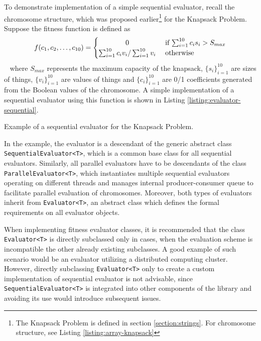 To demonstrate implementation of a simple sequential evaluator, recall the chromosome structure, which was proposed earlier\footnote{The Knapsack Problem is defined in section \ref{section:strings}. For chromosome structure, see Listing \ref{listing:array-knapsack}} for the Knapsack Problem. Suppose the fitness function is defined as
~
\begin{align}
	f(c_1, c_2, \dots, c_{10})
	=
	\begin{cases} 
		\hfill 0 \hfill & \text{ if $\sum_{i=1}^{10} c_i s_i>S_{max}$} \\
		\hfill \sum_{i=1}^{10} c_i v_i / \sum_{i=1}^{10} v_i \hfill & \text{ otherwise} \\
	\end{cases}
\end{align}
~
where $S_{max}$ represents the maximum capacity of the knapsack, $\{s_i\}_{i=1}^{10}$ are sizes of things, $\{v_i\}_{i=1}^{10}$ are values of things and $\{c_i\}_{i=1}^{10}$ are 0/1 coefficients generated from the Boolean values of the chromosome. A simple implementation of a sequential evaluator using this function is shown in Listing \ref{listing:evaluator-sequential}.

\begin{listing}[ht]
	\caption{Example of a sequential evaluator for the Knapsack Problem.}
	\label{listing:evaluator-sequential}
\end{listing}

In the example, the evaluator is a descendant of the generic abstract class \texttt{SequentialEvaluator<T>}, which is a common base class for all sequential evaluators. Similarly, all parallel evaluators have to be descendants of the class \texttt{ParallelEvaluator<T>}, which instantiates multiple sequential evaluators operating on different threads and manages internal producer-consumer queue to facilitate parallel evaluation of chromosomes. Moreover, both types of evaluators inherit from \texttt{Evaluator<T>}, an abstract class which defines the formal requirements on all evaluator objects.

When implementing fitness evaluator classes, it is recommended that the class \texttt{Evaluator<T>} is directly subclassed only in cases, when the evaluation scheme is incompatible the other already existing subclasses. A good example of such scenario would be an evaluator utilizing a distributed computing cluster. However, directly subclassing \texttt{Evaluator<T>} only to create a custom implementation of sequential evaluator is not advisable, since \texttt{SequentialEvaluator<T>} is integrated into other components of the library and avoiding its use would introduce subsequent issues.

